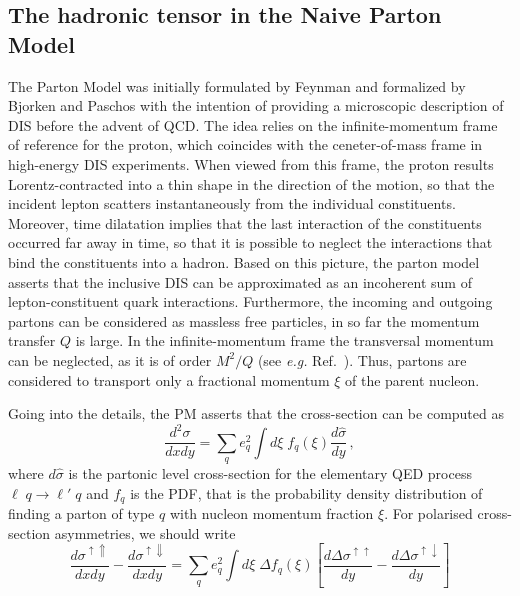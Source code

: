 \subsection{The hadronic tensor in the Naive Parton Model}
The Parton Model was initially formulated by Feynman \cite{PhysRevLett.23.1415} and formalized by Bjorken and Paschos \cite{PhysRev.185.1975} with the intention of providing a microscopic description of DIS before the advent of QCD. The idea relies on the infinite-momentum frame of reference for the proton, which coincides with the ceneter-of-mass frame in high-energy DIS experiments. When viewed from this frame, the proton results Lorentz-contracted into a thin shape in the direction of the motion, so that the incident lepton scatters instantaneously from the individual constituents. Moreover, time dilatation implies that the last interaction of the constituents occurred far away in time, so that it is possible to neglect the interactions that bind the constituents into a hadron. Based on this picture, the parton model asserts that the inclusive DIS can be approximated as an incoherent sum of lepton-constituent quark interactions. Furthermore, the incoming and outgoing partons can be considered as massless free particles, in so far the momentum transfer $Q$ is large. In the infinite-momentum frame the transversal momentum can be neglected, as it is of order $M^2/Q$ (see \textit{e.g.} Ref.~\cite{collins_2011}). Thus, partons are considered to transport only a fractional momentum $\xi$ of the parent nucleon.\par
Going into the details, the PM asserts that the cross-section can be computed as
\begin{equation}
  \frac{d^2 \sigma}{dx dy} = \sum_{q} e_q^2 \int d\xi \;f_q (\xi) \frac{d \hat{\sigma}}{dy}\,,
  \label{eq:PM_CS}
\end{equation}
where $d \hat{\sigma}$ is the partonic level cross-section for the elementary QED process $\ell \; q \rightarrow \ell' \; q$ and $f_q$ is the PDF, that is the probability density distribution of finding a parton of type $q$ with nucleon momentum fraction $\xi$. For polarised cross-section asymmetries, we should write
\begin{equation}
  \frac{d \sigma^{\uparrow \Uparrow}}{dx dy} - \frac{d \sigma^{\uparrow \Downarrow}}{dx dy} = \sum_{q} e_q^2 \int d\xi \; \Delta f_q (\xi) \left[ \frac{d \Delta \sigma^{\uparrow \uparrow}}{dy} - \frac{d \Delta \sigma^{\uparrow \downarrow}}{dy} \right]
  \label{eq:PM_fact}
\end{equation}
